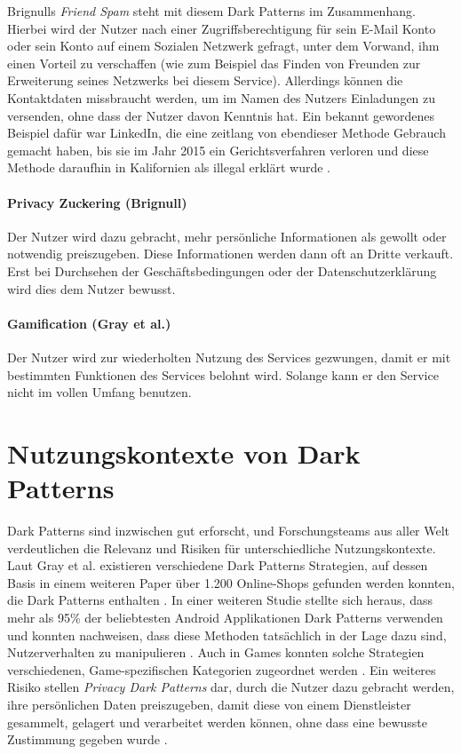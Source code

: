 \documentclass[a4paper]{article}
\begin{document}
Brignulls \textit{Friend Spam} steht mit diesem Dark Patterns im Zusammenhang. Hierbei wird der Nutzer nach einer Zugriffsberechtigung für sein E-Mail Konto oder sein Konto auf einem Sozialen Netzwerk gefragt, unter dem Vorwand, ihm einen Vorteil zu verschaffen (wie zum Beispiel das Finden von Freunden zur Erweiterung seines Netzwerks bei diesem Service). Allerdings können die Kontaktdaten missbraucht werden, um im Namen des Nutzers Einladungen zu versenden, ohne dass der Nutzer davon Kenntnis hat.
Ein bekannt gewordenes Beispiel dafür war LinkedIn, die eine zeitlang von ebendieser Methode Gebrauch gemacht haben, bis sie im Jahr 2015 ein Gerichtsverfahren verloren und diese Methode daraufhin in Kalifornien als illegal erklärt wurde \cite{brignull5}.   

\paragraph{Privacy Zuckering (Brignull)}
\label{para:privacy_zuckering}
Der Nutzer wird dazu gebracht, mehr persönliche Informationen als gewollt oder notwendig preiszugeben. Diese Informationen werden dann oft an Dritte verkauft. Erst bei Durchsehen der Geschäftsbedingungen oder der Datenschutzerklärung wird dies dem Nutzer bewusst.

\paragraph{Gamification (Gray et al.)}
\label{para:gamification}
Der Nutzer wird zur wiederholten Nutzung des Services gezwungen, damit er mit bestimmten Funktionen des Services belohnt wird. Solange kann er den Service nicht im vollen Umfang benutzen. 

\newpage

\section{Nutzungskontexte von Dark Patterns} %
\label{sec:nutzungskontexte_von_dark_patterns}
Dark Patterns sind inzwischen gut erforscht, und Forschungsteams aus aller Welt verdeutlichen die Relevanz und Risiken für unterschiedliche Nutzungskontexte. Laut Gray et al. existieren verschiedene Dark Patterns Strategien, auf dessen Basis in einem weiteren Paper über 1.200 Online-Shops gefunden werden konnten, die Dark Patterns enthalten \cite{gray}\cite{mathur}. In einer weiteren Studie stellte sich heraus, dass mehr als 95\% der beliebtesten Android Applikationen Dark Patterns verwenden und konnten nachweisen, dass diese Methoden tatsächlich in der Lage dazu sind, Nutzerverhalten zu manipulieren \cite{geronimo}. Auch in Games konnten solche Strategien verschiedenen, Game-spezifischen Kategorien zugeordnet werden \cite{zagal}. Ein weiteres Risiko stellen \textit{Privacy Dark Patterns} dar, durch die Nutzer dazu gebracht werden, ihre persönlichen Daten preiszugeben, damit diese von einem Dienstleister gesammelt, gelagert und verarbeitet werden können, ohne dass eine bewusste Zustimmung gegeben wurde \cite{boesch}. 
\end{document}
